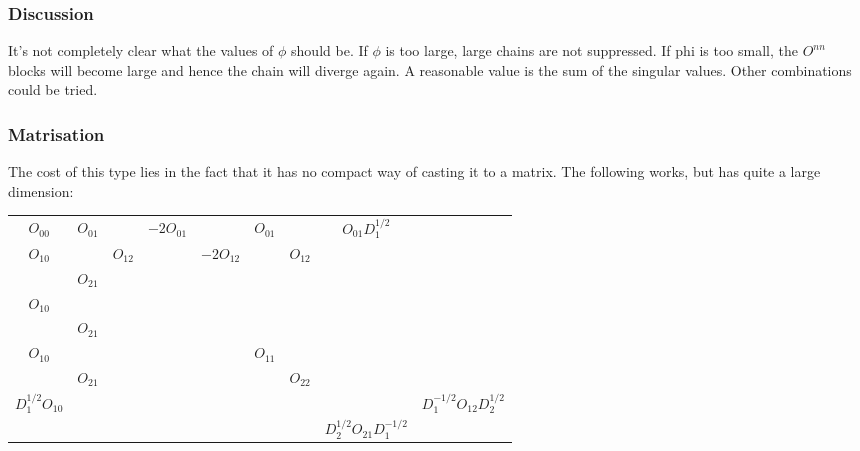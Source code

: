 \subsubsection{Discussion}
It's not completely clear what the values of $\phi$ should be.  If $\phi$ is too large, large chains are not suppressed. If phi is too small, the $O^{n n}$ blocks will become large and hence the chain will diverge again. A reasonable value is the sum of the singular values. Other combinations could be tried.

\subsubsection{Matrisation}
The cost of this type lies in the fact that it has no compact way of casting it to a matrix. The following works, but has quite a large dimension:

\begin{tabular}{ccc|cc|cc|cc}
    $O_{00}$               & $O_{01} $   &             & $-2  O_{01}$ &                & $ O_{01}$ &             & $ O_{01}  D_1^{1/2}$           &                                \\
    ${O_{10}}$             &             & ${ O_{12}}$ &              & $-2 { O_{12}}$ &           & ${ O_{12}}$ &                                &                                \\
                           & ${ O_{21}}$ &             &              &                &           &             &                                &                                \\
    \hline
    ${O_{10}}$             &             &             &              &                &           &             &                                &                                \\
                           & ${ O_{21}}$ &             &              &                &           &             &                                &                                \\
    \hline
    ${ O_{10}}$            &             &             &              &                & $O_{11}$  &             &                                &                                \\
                           & ${ O_{21}}$ &             &              &                &           & $O_{22}$    &                                &                                \\
    \hline
    $ D_1^{1/2} { O_{10}}$ &             &             &              &                &           &             &                                & $D_1^{-1/2} O_{12}  D_2^{1/2}$ \\
                           &             &             &              &                &           &             & $ D_2^{1/2} O_{21} D_1^{-1/2}$                                  \\\end{tabular}

